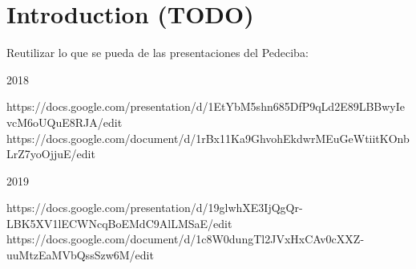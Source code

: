 
\chapter{Introduction (TODO)} %
\label{intro:intro} %



Reutilizar lo que se pueda de las presentaciones del Pedeciba:

2018

https://docs.google.com/presentation/d/1EtYbM5shn685DfP9qLd2E89LBBwyIevcM6oUQuE8RJA/edit
https://docs.google.com/document/d/1rBx11Ka9GhvohEkdwrMEuGeWtiitKOnbLrZ7yoOjjuE/edit

2019

https://docs.google.com/presentation/d/19glwhXE3IjQgQr-LBK5XV1lECWNcqBoEMdC9AlLMSaE/edit
https://docs.google.com/document/d/1c8W0dungTl2JVxHxCAv0cXXZ-uuMtzEaMVbQssSzw6M/edit
